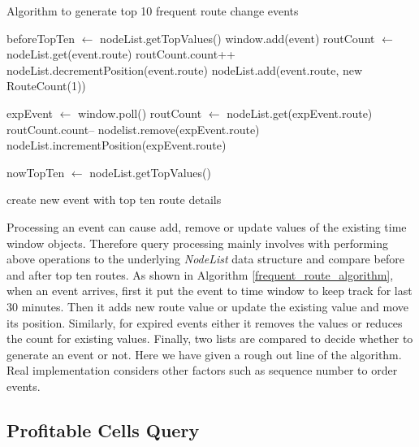 \begin{algorithm}
\caption{Algorithm to generate top 10 frequent route change events}
\label{frequent_route_algorithm}
\begin{algorithmic} 
\STATE beforeTopTen $\leftarrow$ nodeList.getTopValues() 
\STATE window.add(event) 
	\STATE routCount $\leftarrow$ nodeList.get(event.route) 
	\STATE routCount.count++ 
	\STATE nodeList.decrementPosition(event.route) 
\ELSE
	\STATE nodeList.add(event.route, new RouteCount(1)) 
\ENDIF

	\STATE  expEvent $\leftarrow$ window.poll() 
	\STATE  routCount $\leftarrow$ nodeList.get(expEvent.route)
	\STATE  routCount.count-- 
		\STATE nodelist.remove(expEvent.route)
	\ELSE
		\STATE nodeList.incrementPosition(expEvent.route) 
	\ENDIF
\ENDWHILE

\STATE nowTopTen $\leftarrow$ nodeList.getTopValues() 

	\STATE create new event with top ten route details 
\ENDIF

\end{algorithmic}
\end{algorithm}

Processing an event can cause add, remove or update values of the existing time window objects. Therefore query processing mainly involves with performing above operations to the underlying \textit{NodeList} data structure and compare before and after top ten routes. As shown in Algorithm \ref{frequent_route_algorithm}, when an event arrives, first it put the event to time window to keep track for last 30 minutes. Then it adds new route value or update the existing value and move its position. Similarly, for expired events either it removes the values or reduces the count for existing values. Finally, two lists are compared to decide whether to generate an event or not. Here we have given a rough out line of the algorithm. Real implementation considers other factors such as sequence number to order events.

\subsection{Profitable Cells Query}

